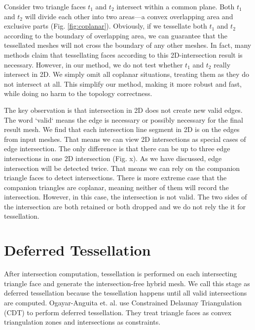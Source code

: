 \documentclass[10pt,journal,compsoc]{IEEEtran}
\begin{document}
Consider two triangle faces $t_1$ and $t_2$ intersect within a common plane. Both $t_1$ and $t_2$ will divide each other into two areas---a convex overlapping area and exclusive parts (Fig. \ref{fig:coplanar}). Obviously, if we tessellate both $t_1$ and $t_2$ according to the boundary of overlapping area, we can guarantee that the tessellated meshes will not cross the boundary of any other meshes. In fact, many methods \cite{feito2013fast,zhou2016mesh} claim that tessellating faces according to this 2D-intersection result is necessary. However, in our method, we do not test whether $t_1$ and $t_2$ really intersect in 2D. We simply omit all coplanar situations, treating them as they do not intersect at all. This simplify our method, making it more robust and fast, while doing no harm to the topology correctness.

The key observation is that intersection in 2D does not create new valid edges. The word `valid` means the edge is necessary or possibly necessary for the final result mesh. We find that each intersection line segment in 2D is on the edges from input meshes. That means we can view 2D intersections as special cases of edge intersection. The only difference is that there can be up to three edge intersections in one 2D intersection (Fig. x). As we have discussed, edge intersection will be detected twice. That means we can rely on the companion triangle faces to detect intersections. There is more extreme case that the companion triangles are coplanar, meaning neither of them will record the intersection. However, in this case, the intersection is not valid. The two sides of the intersection are both retained or both dropped and we do not rely the it for tessellation.

\section{Deferred Tessellation}



\label{sec:tessellation}
After intersection computation, tessellation is performed on each intersecting triangle face and generate the intersection-free hybrid mesh. We call this stage as deferred tessellation because the tessellation happens until all valid intersections are computed. Ogayar-Anguita et. al. \cite{ogayar2015deferred} use Constrained Delaunay Triangulation (CDT) to perform deferred tessellation. They treat triangle faces as convex triangulation zones and intersections as constraints.
\end{document}
